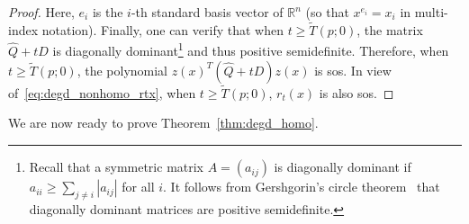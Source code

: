 \documentclass[12pt]{article}
\newcommand{\reals}{\mathbb{R}}
\newcommand{\HSOS}{\widehat{\mathbf{\Sigma}}}
\newcommand{\defeq}{\coloneq}
\newtheorem{lemma}[theorem]{Lemma}  %
\theoremstyle{remark}
\begin{document}
\begin{proof}
Here, $e_i$ is the $i$-th standard basis vector of $\reals^n$ (so that $x^{e_i}=x_i$ in multi-index notation). Finally, one can verify that when $t\ge \tilde{T}(p;0)$, the matrix $\hat{Q}+tD$ is diagonally dominant\footnote{Recall that a symmetric matrix $A=(a_{ij})$ is diagonally dominant if $a_{ii}\ge \sum_{j\neq i}|a_{ij}|$ for all $i$. It follows from Gershgorin's circle theorem~\cite{gershgorin1931uber} that diagonally {dominant} matrices are positive semidefinite.} and thus positive semidefinite. Therefore, when $t\ge\tilde{T}(p;0)$, the polynomial $z(x)^T(\hat{Q}+tD)z(x)$ is sos. In view of~\eqref{eq:degd_nonhomo_rtx}, when $t\ge\tilde{T}(p;0)$, $r_t(x)$ is also sos.

\end{proof}
We are now ready to prove Theorem~\ref{thm:degd_homo}.




\end{document}
